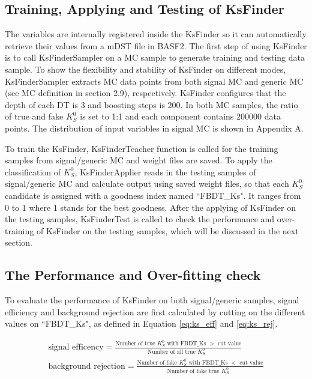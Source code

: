 \subsection{Training, Applying and Testing of KsFinder}
The variables are internally registered inside the KsFinder so it can automatically retrieve their values from a mDST file in BASF2. The first step of using KsFinder is to call KsFinderSampler on a MC sample to generate training and testing data sample. To show the flexibility and stability of KsFinder on different modes, KsFinderSampler extracts MC data points from both signal MC and generic MC (see MC definition in section 2.9), respectively.  KsFinder configures that the depth of each DT is 3 and boosting steps is 200. In both MC samples, the ratio of true and fake $K_S^0$ is set to 1:1 and each component contains 200000 data points. The distribution of input variables in signal MC is shown in Appendix A. 

To train the KsFinder, KsFinderTeacher function is called for the training samples from signal/generic MC and weight files are saved. To apply the classification of $K_S^0$, KsFinderApplier reads in the testing samples of signal/generic MC and calculate output using saved weight files, so that each $K_S^0$ candidate is assigned with a goodness index named ``FBDT\_Ks". It ranges from 0 to 1 where 1 stands for the best goodness. After the applying of KsFinder on the testing samples, KsFinderTest is called to check the performance and over-training of KsFinder on the testing samples, which will be discussed in the next section. 

\subsection{The Performance and Over-fitting check}
To evaluate the performance of KsFinder on both signal/generic samples,  signal efficiency and background rejection are first calculated by cutting on the different values on ``FBDT\_Ks", as defined in Equation \ref{eq:ks_eff} and \ref{eq:ks_rej}.

\begin{eqnarray}
	\text{signal efficency} = \frac{\text{Number of true $K_S^0$ with FBDT\_Ks $>$ cut value}}{\text{Number of all true $K_S^0$ }} \label{eq:ks_eff}\\
	\text{background rejection} = \frac{\text{Number of fake $K_S^0$ with FBDT\_Ks $<$ cut value}}{\text{Number of fake true $K_S^0$ }} \label{eq:ks_rej}
\end{eqnarray}

